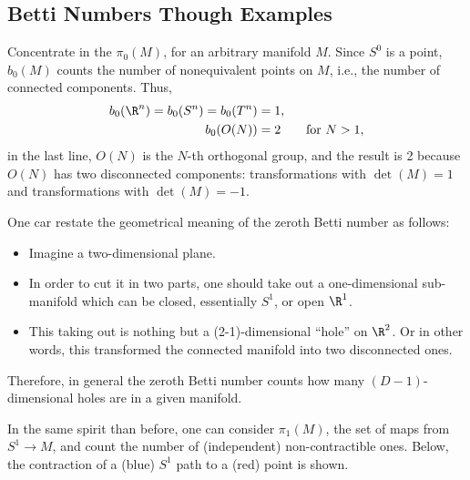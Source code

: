 \subsection{Betti Numbers Though Examples}

Concentrate in the $\pi_0(M)$, for an arbitrary manifold $M$. Since $S^0$ is a point, $b_0(M)$ counts the number of nonequivalent points on $M$, i.e., the number of connected components. Thus,
\begin{align}
  b_0(\R^n)=b_0(S^n)=b_0(T^n) &= 1,\\
  b_0(O(N)) &= 2\qquad\text{for }N>1,
\end{align}
in the last line, $O(N)$ is the $N$-th orthogonal group, and the result is 2 because $O(N)$ has two disconnected components: transformations with $\det(M)=1$ and transformations with $\det(M)=-1$.

One car restate the geometrical meaning of the zeroth Betti number as follows:
\begin{itemize}
\item Imagine a two-dimensional plane.
\item In order to cut it in two parts, one should take out a one-dimensional sub-manifold which can be closed, essentially $S^1$,  or open $\R^1$.
\item This taking out is nothing but a (2-1)-dimensional ``hole'' on $\R^2$. Or in other words, this transformed the connected manifold into two disconnected ones.
\end{itemize}
Therefore, in general the zeroth Betti number counts how many $(D-1)$-dimensional holes  are in a given manifold.

In  the same spirit than before, one can consider $\pi_1(M)$, the set of maps from $S^1\to M$, and count the number of (independent) non-contractible ones. Below,%
the contraction  of a (blue) $S^1$ path to a (red) point is shown.
\begin{center}
  \begin{center}
  \end{center}
\end{center}

